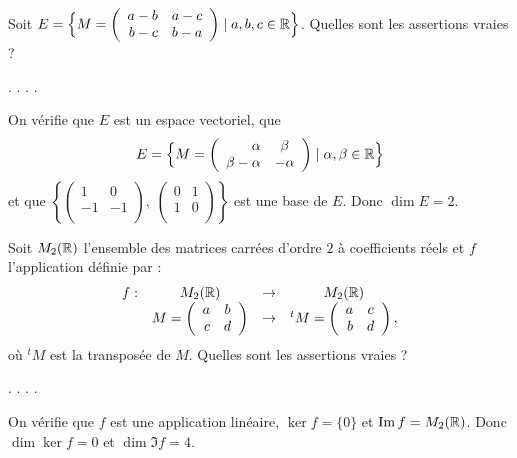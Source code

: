\begin{question}
Soit $E=\Big\{M =\left(\begin{array}{rc}a-b&a-c\\b-c&b-a\end{array}\right)\mid a,b,c\in \mathbb{R}\Big\}$. Quelles sont les assertions vraies ?
\begin{answers}  
.
.
.
.
\end{answers}
\begin{explanations} On vérifie que $E$ est un espace vectoriel, que
$$E=\Big\{M =\left(\begin{array}{rc}
\alpha&\beta\\ \beta - \alpha&-\alpha\\ 
\end{array}\right)\mid \alpha, \beta \in \mathbb{R} \Big\}$$ 
et que $\left \{\left(\begin{array}{rc} 1&0\\
-1&-1\\ \end{array}\right), \;  \left(\begin{array}{rc}
0&1\\ 1&0\\ \end{array}\right) \right \}$ est  une base de $E$. Donc $\dim E = 2$.
\end{explanations}
\end{question}



\begin{question}
Soit $ M_2(\mathbb{R})$ l'ensemble des matrices carrées d'ordre $2$ à coefficients réels  et 
$f$ l'application  définie par :
$$\begin{array}{rccc}f:&M_2(\mathbb{R})&\to& M_2(\mathbb{R})\\
& M = \left(\begin{array}{rc}a&b\\ c&d\\ 
\end{array}\right) &\to &^tM = \left(\begin{array}{rc}
a&c\\b&d\\ \end{array}\right),  \end{array}$$
où $^tM$ est la transposée de $M$. Quelles sont les assertions vraies ?
\begin{answers}  
.
.
.
.
\end{answers}
\begin{explanations} On vérifie que $f$ est une application linéaire, $\ker f =\{0\}$ et $\mathop{\mathrm{Im}}\nolimits f = M_2(\mathbb{R})$. Donc $\dim \ker f = 0$ et $ \dim \Im f = 4$.
\end{explanations}
\end{question}


